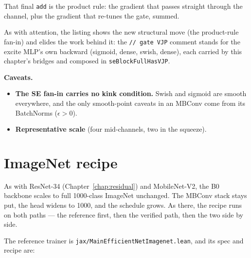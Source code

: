 \noindent That final \texttt{add} is the product rule: the gradient
that passes straight through the channel, plus the gradient that re-tunes
the gate, summed.

\medskip\noindent As with attention, the listing shows the new structural
move (the product-rule fan-in) and elides the work behind it: the
\texttt{// gate VJP} comment stands for the excite MLP's own backward
(sigmoid, dense, swish, dense), each carried by this chapter's bridges and
composed in \texttt{seBlockFullHasVJP}.

\medskip\noindent\textbf{Caveats.}
\begin{itemize}
  \item \textbf{The SE fan-in carries no kink condition.} Swish and
    sigmoid are smooth everywhere, and the only smooth-point caveats in an
    MBConv come from its BatchNorms ($\epsilon > 0$).
  \item \textbf{Representative scale} (four mid-channels, two in the squeeze).
\end{itemize}

\section{ImageNet recipe}
\label{sec:enet_imagenet}

As with ResNet-34 (Chapter~\ref{chap:residual}) and MobileNet-V2,
the B0 backbone scales to full 1000-class ImageNet unchanged. The
MBConv stack stays put, the head widens to 1000, and the schedule grows.
As there, the recipe runs on both paths --- the reference first, then the
verified path, then the two side by side.


The reference trainer is \texttt{jax/MainEfficientNetImagenet.lean}, and
its spec and recipe are:

